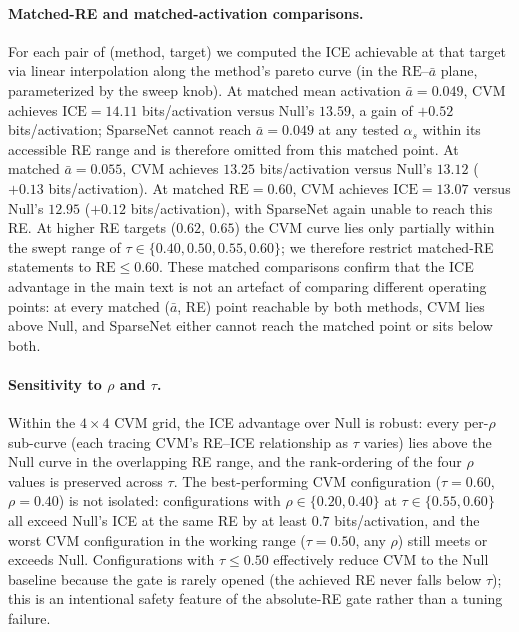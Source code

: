 \documentclass[11pt]{article}
\theoremstyle{remark}
\theoremstyle{definition}
\begin{document}
\paragraph{Matched-RE and matched-activation comparisons.}
For each pair of (method, target) we computed the ICE achievable at that target via linear interpolation along the method's pareto curve (in the $\mathrm{RE}$--$\bar{a}$ plane, parameterized by the sweep knob).  At matched mean activation $\bar{a}=0.049$, CVM achieves $\mathrm{ICE}=14.11$ bits/activation versus Null's $13.59$, a gain of $+0.52$ bits/activation; SparseNet cannot reach $\bar{a}=0.049$ at any tested $\alpha_s$ within its accessible RE range and is therefore omitted from this matched point.  At matched $\bar{a}=0.055$, CVM achieves $13.25$ bits/activation versus Null's $13.12$ ($+0.13$ bits/activation).  At matched $\mathrm{RE}=0.60$, CVM achieves $\mathrm{ICE}=13.07$ versus Null's $12.95$ ($+0.12$ bits/activation), with SparseNet again unable to reach this RE.  At higher RE targets ($0.62$, $0.65$) the CVM curve lies only partially within the swept range of $\tau\in\{0.40,0.50,0.55,0.60\}$; we therefore restrict matched-RE statements to $\mathrm{RE}\le 0.60$.  These matched comparisons confirm that the ICE advantage in the main text is not an artefact of comparing different operating points: at every matched ($\bar{a}$, RE) point reachable by both methods, CVM lies above Null, and SparseNet either cannot reach the matched point or sits below both.

\paragraph{Sensitivity to $\rho$ and $\tau$.}
Within the $4\!\times\!4$ CVM grid, the ICE advantage over Null is robust: every per-$\rho$ sub-curve (each tracing CVM's RE--ICE relationship as $\tau$ varies) lies above the Null curve in the overlapping RE range, and the rank-ordering of the four $\rho$ values is preserved across $\tau$.  The best-performing CVM configuration ($\tau=0.60$, $\rho=0.40$) is not isolated: configurations with $\rho\in\{0.20,0.40\}$ at $\tau\in\{0.55,0.60\}$ all exceed Null's ICE at the same RE by at least $0.7$ bits/activation, and the worst CVM configuration in the working range ($\tau=0.50$, any $\rho$) still meets or exceeds Null.  Configurations with $\tau\le 0.50$ effectively reduce CVM to the Null baseline because the gate is rarely opened (the achieved RE never falls below $\tau$); this is an intentional safety feature of the absolute-RE gate rather than a tuning failure.
\end{document}
